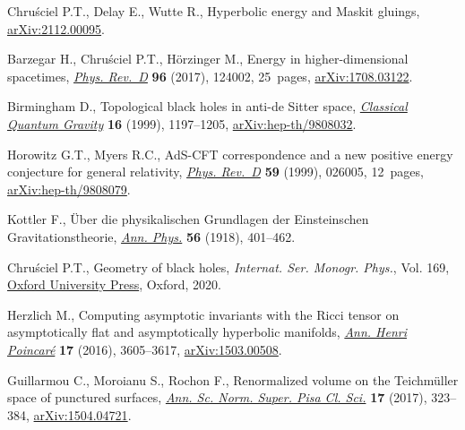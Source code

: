 
Chru\'sciel P.T., Delay E., Wutte R., Hyperbolic energy and {M}askit gluings,
 \href{https://arxiv.org/abs/2112.00095}{arXiv:2112.00095}.


Barzegar H., Chru\'sciel P.T., H\"orzinger M., Energy in higher-dimensional
 spacetimes, \href{https://doi.org/10.1103/physrevd.96.124002}{\textit{Phys. Rev.~D}} \textbf{96} (2017), 124002, 25~pages,
 \href{https://arxiv.org/abs/1708.03122}{arXiv:1708.03122}.


Birmingham D., Topological black holes in anti-de {S}itter space,
 \href{https://doi.org/10.1088/0264-9381/16/4/009}{\textit{Classical Quantum Gravity}} \textbf{16} (1999), 1197--1205,
 \href{https://arxiv.org/abs/hep-th/9808032}{arXiv:hep-th/9808032}.


Horowitz G.T., Myers R.C., Ad{S}-{CFT} correspondence and a new positive energy
 conjecture for general relativity, \href{https://doi.org/10.1103/PhysRevD.59.026005}{\textit{Phys. Rev.~D}} \textbf{59} (1999),
 026005, 12~pages, \href{https://arxiv.org/abs/hep-th/9808079}{arXiv:hep-th/9808079}.


Kottler F., \"Uber die physikalischen Grundlagen der Einsteinschen
 Gravitationstheorie, \href{https://doi.org/10.1002/andp.19183611402}{\textit{Ann. Phys.}} \textbf{56} (1918), 401--462.


Chru\'sciel P.T., Geometry of black holes, \textit{Internat. Ser. Monogr.
 Phys.}, Vol. 169, \href{https://doi.org/10.1093/oso/9780198855415.001.0001}{Oxford University Press}, Oxford, 2020.


Herzlich M., Computing asymptotic invariants with the {R}icci tensor on
 asymptotically flat and asymptotically hyperbolic manifolds, \href{https://doi.org/10.1007/s00023-016-0494-5}{\textit{Ann.
 Henri Poincar\'e}} \textbf{17} (2016), 3605--3617, \href{https://arxiv.org/abs/1503.00508}{arXiv:1503.00508}.


Guillarmou C., Moroianu S., Rochon F., Renormalized volume on the
 {T}eichm\"uller space of punctured surfaces, \href{https://doi.org/10.2422/2036-2145.201506_002}{\textit{Ann. Sc. Norm. Super.
 Pisa Cl. Sci.}} \textbf{17} (2017), 323--384, \href{https://arxiv.org/abs/1504.04721}{arXiv:1504.04721}.


